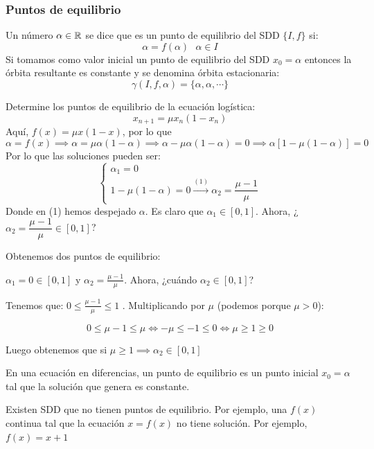 \subsubsection{Puntos de equilibrio}
\begin{ndef}
	Un número $\alpha \in \mathbb{R}$ se dice que es un punto de equilibrio del SDD $\{I,f\}$ si:
	\[
	\alpha = f(\alpha) \ \ \ \alpha \in I
	\]
	Si tomamos como valor inicial un punto de equilibrio del SDD $x_0 = \alpha$ entonces la órbita resultante es constante y se denomina órbita estacionaria:
	\[
	\gamma(I,f,\alpha) = \{\alpha, \alpha, \cdots\}
	\]
\end{ndef}
\begin{ejemplo}
	Determine los puntos de equilibrio de la ecuación logística:
	\[
	x_{n+1} = \mu x_n(1-x_n)
	\]
	Aquí, $f(x) = \mu x(1-x)$, por lo que
	 \[
	\alpha = f(x) \implies \alpha = \mu \alpha (1-\alpha) \implies \alpha - \mu \alpha(1-\alpha) = 0 \implies \alpha[1-\mu(1-\alpha)] = 0
	\]
	Por lo que las soluciones pueden ser:
	\[
	\begin{cases}
	\alpha_1 = 0\\
	1-\mu(1-\alpha) = 0 \xrightarrow{(1)} \alpha_2 = \dfrac{\mu -1}{\mu}
\end{cases}
	\]
	Donde en (1) hemos despejado $\alpha$. Es claro que $\alpha_1 \in [0,1]$. Ahora, ¿$\alpha_2=  \dfrac{\mu -1}{\mu} \in [0,1] $?


	Obtenemos dos puntos de equilibrio:

	$ \alpha_{1} = 0 \in [0,1] $ y $ \alpha_{2}= \frac{\mu - 1}{\mu} $. Ahora, ¿cuándo $\alpha_2\in [0,1] $?

	Tenemos que: $ 0 \leq \frac{\mu - 1}{\mu} \leq 1 $ . Multiplicando por $\mu$ (podemos porque $\mu > 0$):

	$$ 0 \leq \mu - 1 \leq \mu \Leftrightarrow -\mu \leq -1 \leq 0 \Leftrightarrow \mu \geq 1 \geq 0 $$

	Luego obtenemos que si $\mu \geq 1 \implies \alpha_{2} \in [0,1] $

\end{ejemplo}

\begin{ndef}
	En una ecuación en diferencias, un punto de equilibrio es un punto inicial $x_0= \alpha$ tal que la solución que genera es constante.
\end{ndef}

\begin{ejemplo}
	Existen SDD que no tienen puntos de equilibrio. Por ejemplo, una $f(x)$ continua tal que la ecuación $x = f(x)$ no tiene solución. Por ejemplo, $f(x) = x+1$
\end{ejemplo}

